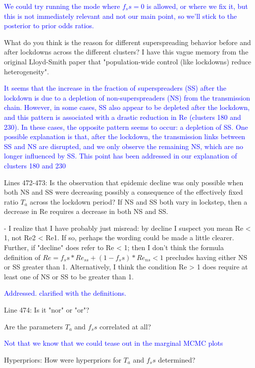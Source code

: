 \documentclass[pdflatex,sn-nature]{sn-jnl}%
\begin{document}
\textcolor{blue}{We could try running the mode where $f_ss=0$ is allowed, or where we fix it, but this is not immediately relevant and not our main point, so we'll stick to the posterior to prior odds ratios. }

What do you think is the reason for different superspreading behavior before and after lockdowns across the different clusters? I have this vague memory from the original Lloyd-Smith paper that "population-wide control (like lockdowns) reduce heterogeneity".

\textcolor{blue}{It seems that the increase in the fraction of superspreaders (SS) after the lockdown is due to a depletion of non-superspreaders (NS) from the transmission chain. However, in some cases, SS also appear to be depleted after the lockdown, and this pattern is associated with a drastic reduction in Re (clusters 180 and 230). In these cases, the opposite pattern seems to occur: a depletion of SS. One possible explanation is that, after the lockdown, the transmission links between SS and NS are disrupted, and we only observe the remaining NS, which are no longer influenced by SS. This point has been addressed in our explanation of clusters 180 and 230}

Lines 472-473: Is the observation that epidemic decline was only possible when both NS and SS were decreasing possibly a consequence of the effectively fixed ratio $T_a$ across the lockdown period? If NS and SS both vary in lockstep, then a decrease in Re requires a decrease in both NS and SS.

- I realize that I have probably just misread: by decline I suspect you mean Re < 1, not Re2 < Re1. If so, perhaps the wording could be made a little clearer. Further, if "decline" does refer to Re < 1; then I don't think the formula definition of $Re = f_ss * Re_{ss} + (1 - f_ss) * Re_{ns} < 1$ precludes having either NS or SS greater than 1. Alternatively, I think the condition Re > 1 does require at least one of NS or SS to be greater than 1.

\textcolor{blue}{Addressed. clarified with the definitions. }

Line 474: Is it "nor" or "or"?

Are the parameters $T_a$ and $f_ss$ correlated at all?

\textcolor{blue}{Not that we know that we could tease out in the marginal MCMC plots}

Hyperpriors: How were hyperpriors for $T_a$ and $f_ss$ determined?
\end{document}
